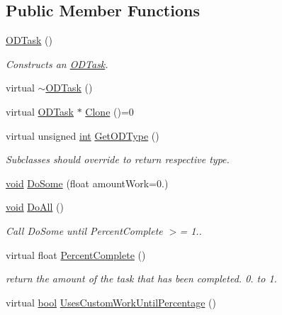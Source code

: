 \subsection*{Public Member Functions}
\begin{DoxyCompactItemize}
\item 
\hyperlink{class_o_d_task_a515b35bc13701a3565b8555ad22b7af2}{O\+D\+Task} ()
\begin{DoxyCompactList}\small\item\em Constructs an \hyperlink{class_o_d_task}{O\+D\+Task}. \end{DoxyCompactList}\item 
virtual \hyperlink{class_o_d_task_a07e86f3711923ada39da0c20ad0aa606}{$\sim$\+O\+D\+Task} ()
\item 
virtual \hyperlink{class_o_d_task}{O\+D\+Task} $\ast$ \hyperlink{class_o_d_task_a932a513efc5107ec19b1157832fbd599}{Clone} ()=0
\item 
virtual unsigned \hyperlink{xmltok_8h_a5a0d4a5641ce434f1d23533f2b2e6653}{int} \hyperlink{class_o_d_task_a1bbfd8894e7aae490eb41887596c8b31}{Get\+O\+D\+Type} ()
\begin{DoxyCompactList}\small\item\em Subclasses should override to return respective type. \end{DoxyCompactList}\item 
\hyperlink{sound_8c_ae35f5844602719cf66324f4de2a658b3}{void} \hyperlink{class_o_d_task_af144a3997d1d3c9a26ee4d5fc7a36e3d}{Do\+Some} (float amount\+Work=0.)
\item 
\hyperlink{sound_8c_ae35f5844602719cf66324f4de2a658b3}{void} \hyperlink{class_o_d_task_a5beda32403ff5ab98820a76426a9168e}{Do\+All} ()
\begin{DoxyCompactList}\small\item\em Call Do\+Some until Percent\+Complete $>$= 1.. \end{DoxyCompactList}\item 
virtual float \hyperlink{class_o_d_task_a7b714f63d612ef0e18db8afcccd2223a}{Percent\+Complete} ()
\begin{DoxyCompactList}\small\item\em return the amount of the task that has been completed. 0. to 1. \end{DoxyCompactList}\item 
virtual \hyperlink{mac_2config_2i386_2lib-src_2libsoxr_2soxr-config_8h_abb452686968e48b67397da5f97445f5b}{bool} \hyperlink{class_o_d_task_a7a2b1b0c6d3d264424ebb543813a2c69}{Uses\+Custom\+Work\+Until\+Percentage} ()

\end{DoxyCompactItemize}
